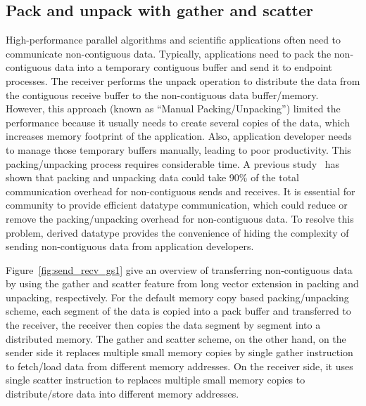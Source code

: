 \documentclass[conference]{IEEEtran}
\begin{document}
\subsection{Pack and unpack with gather and scatter}
High-performance parallel algorithms and scientific applications often
need to communicate non-contiguous data. Typically, applications need to pack
the non-contiguous data into a temporary contiguous buffer and send it to endpoint processes.
The receiver performs the unpack operation to distribute the data from the contiguous
receive buffer to the non-contiguous data buffer/memory.
However, this approach (known as ``Manual Packing/Unpacking”) limited the performance because
it usually needs to create several copies of the data, which increases memory footprint of the application.
Also, application developer needs to manage those temporary
buffers manually, leading to poor productivity. This packing/unpacking process requires considerable time.
A previous study~\cite{mpi-ddt-benchmark} has shown that packing
and unpacking data could take 90\% of the total communication
overhead for non-contiguous sends and receives.
It is essential for \mpi community to provide efficient \mpi datatype communication, which could
reduce or remove the packing/unpacking overhead for non-contiguous data.
To resolve this problem, \mpi derived datatype provides the convenience of hiding the complexity of sending
non-contiguous data from application developers.

Figure~\ref{fig:send_recv_gs1} give an overview of \ourwork transferring non-contiguous data
by using the gather and scatter feature from long vector extension in packing and unpacking, respectively.
For the default memory copy based packing/unpacking scheme, each segment of the data is copied into a pack
buffer and transferred to the receiver, the receiver then copies the data segment by segment into a distributed memory.
The gather and scatter scheme, on the other hand, on the sender side it replaces multiple small memory
copies by single gather instruction to fetch/load data from different memory addresses.
On the receiver side, it uses single scatter instruction to replaces multiple small memory
copies to distribute/store data into different memory addresses.
\end{document}
